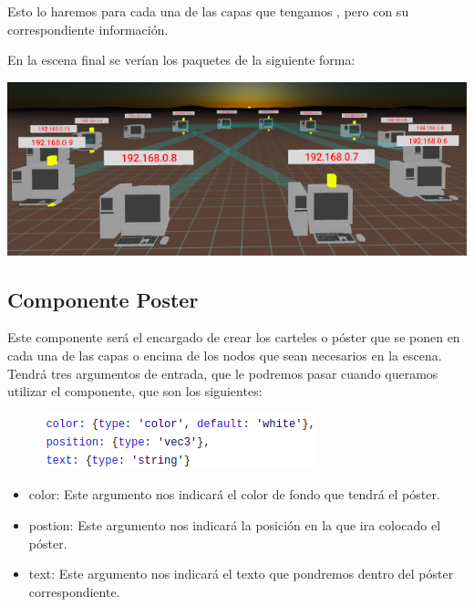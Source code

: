 \documentclass[a4paper, 12pt]{book}
\begin{document}
Esto lo haremos para cada una de las capas que tengamos , pero con su correspondiente información.

En la escena final se verían los paquetes de la siguiente forma:
\begin{center}
    \includegraphics[scale=0.58]{img/componentePacket_modelo.png}
\end{center}

\subsection{Componente Poster}

Este componente será el encargado de crear los carteles o póster que se ponen en cada una de las capas o encima de los nodos que sean necesarios en la escena. Tendrá tres argumentos de entrada, que le podremos pasar cuando queramos utilizar el componente, que son los siguientes:

\begin{figure}[h]
\centering
    \includegraphics[scale=0.7]{img/arg_comp_poster.png}
\end{figure}

\begin{itemize}
    
    \item color: Este argumento nos indicará el color de fondo que tendrá el póster.
    
    \item postion: Este argumento nos indicará la posición en la que ira colocado el póster.
    
    \item text: Este argumento nos indicará el texto que pondremos dentro del póster correspondiente.
 
\end{itemize}
\end{document}
